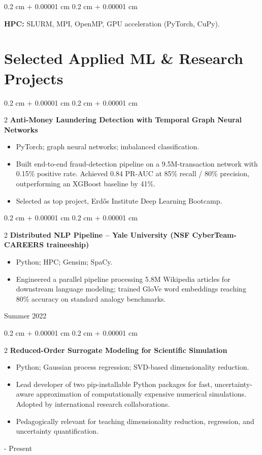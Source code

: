 \documentclass[10pt, letterpaper]{article}
\newenvironment{highlights}{
    \begin{itemize}[
        topsep=0.10 cm,
        parsep=0.10 cm,
        partopsep=0pt,
        itemsep=0pt,
        leftmargin=0.4 cm + 10pt
    ]
}{
    \end{itemize}
}
\newenvironment{onecolentry}{
    \begin{adjustwidth}{
        0.2 cm + 0.00001 cm
    }{
        0.2 cm + 0.00001 cm
    }
}{
    \end{adjustwidth}
}
\newenvironment{twocolentry}[2][]{
    \onecolentry
    \def\secondColumn{#2}
    \setcolumnwidth{\fill, 3.5 cm}
    \begin{paracol}{2}
}{
    \switchcolumn \raggedleft \secondColumn
    \end{paracol}
    \endonecolentry
}
\begin{document}
\vspace{0.2 cm}
 
\begin{onecolentry}
  \textbf{HPC:} SLURM, MPI, OpenMP, GPU acceleration (PyTorch, CuPy).
\end{onecolentry}
 
 
\section{Selected Applied ML \& Research Projects}
 
\begin{twocolentry}{2025}{\textbf{Anti-Money Laundering Detection with Temporal Graph Neural Networks}}
  \begin{highlights}
    \item PyTorch; graph neural networks; imbalanced classification.
    \item Built end-to-end fraud-detection pipeline on a 9.5M-transaction network with 0.15\% positive rate. Achieved 0.84 PR-AUC at 85\% recall / 80\% precision, outperforming an XGBoost baseline by 41\%.
    \item Selected as top project, Erd\H{o}s Institute Deep Learning Bootcamp.
  \end{highlights}
\end{twocolentry}
 
\vspace{0.2 cm}
 
\begin{twocolentry}{Summer 2022}{\textbf{Distributed NLP Pipeline -- Yale University (NSF CyberTeam-CAREERS traineeship)}}
  \begin{highlights}
    \item Python; HPC; Gensim; SpaCy.
    \item Engineered a parallel pipeline processing 5.8M Wikipedia articles for downstream language modeling; trained GloVe word embeddings reaching 80\% accuracy on standard analogy benchmarks.
  \end{highlights}
\end{twocolentry}
 
\vspace{0.2 cm}
 
\begin{twocolentry}{2022 - Present}{\textbf{Reduced-Order Surrogate Modeling for Scientific Simulation}}
  \begin{highlights}
    \item Python; Gaussian process regression; SVD-based dimensionality reduction.
    \item Lead developer of two pip-installable Python packages for fast, uncertainty-aware approximation of computationally expensive numerical simulations. Adopted by international research collaborations.
    \item Pedagogically relevant for teaching dimensionality reduction, regression, and uncertainty quantification.
  \end{highlights}
\end{twocolentry}
 
\end{document}
